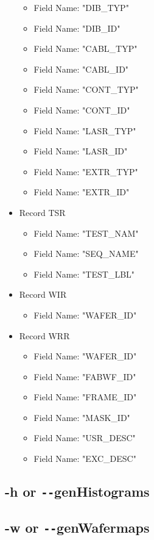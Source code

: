 \documentclass[letterpaper]{article}
\begin{document}
\begin{itemize}
\begin{itemize}
    \item Field Name: "DIB\_TYP"
    \item Field Name: "DIB\_ID"
    \item Field Name: "CABL\_TYP"
    \item Field Name: "CABL\_ID"
    \item Field Name: "CONT\_TYP"
    \item Field Name: "CONT\_ID"
    \item Field Name: "LASR\_TYP"
    \item Field Name: "LASR\_ID"
    \item Field Name: "EXTR\_TYP"
    \item Field Name: "EXTR\_ID"
    \end{itemize}
\item Record TSR
    \begin{itemize}
    \item Field Name: "TEST\_NAM"
    \item Field Name: "SEQ\_NAME"
    \item Field Name: "TEST\_LBL"
    \end{itemize}
\item Record WIR
    \begin{itemize}
    \item Field Name: "WAFER\_ID"
    \end{itemize}
\item Record WRR
    \begin{itemize}
    \item Field Name: "WAFER\_ID"
    \item Field Name: "FABWF\_ID"
    \item Field Name: "FRAME\_ID"
    \item Field Name: "MASK\_ID"
    \item Field Name: "USR\_DESC"
    \item Field Name: "EXC\_DESC"
    \end{itemize}
\end{itemize}

\subsection{-h or \texttt{-{}-}genHistograms}


\subsection{-w or \texttt{-{}-}genWafermaps}
\end{document}
